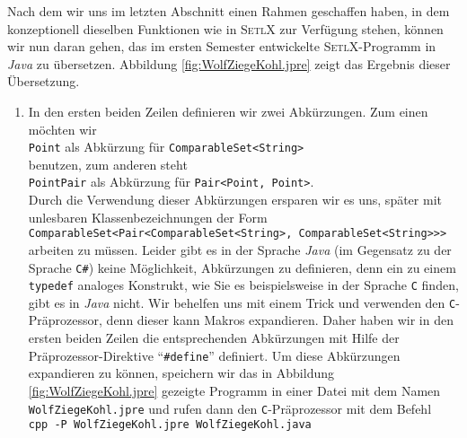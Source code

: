 \noindent
Nach dem wir uns im letzten Abschnitt einen Rahmen geschaffen haben, in dem konzeptionell
dieselben Funktionen wie in \textsc{SetlX} zur Verf\"ugung stehen, k\"onnen wir nun daran
gehen, das im ersten Semester entwickelte \textsc{SetlX}-Programm in \textsl{Java} zu \"ubersetzen.
Abbildung \ref{fig:WolfZiegeKohl.jpre} zeigt das Ergebnis dieser Übersetzung.
\begin{enumerate}
\item In den ersten beiden Zeilen definieren wir zwei Abk\"urzungen.  Zum einen m\"ochten wir
      \\[0.2cm]
      \hspace*{1.3cm}
      \texttt{Point} \quad als Abk\"urzung f\"ur \quad \texttt{ComparableSet<String>}
      \\[0.2cm]
      benutzen, zum anderen steht
      \\[0.2cm]
      \hspace*{1.3cm}
      \texttt{PointPair} \quad als Abk\"urzung f\"ur \quad \texttt{Pair<Point, Point>}.
      \\[0.2cm]
      Durch die Verwendung dieser Abk\"urzungen ersparen wir es uns, sp\"ater mit
      unlesbaren Klassenbezeichnungen der Form
      \\[0.2cm]
      \hspace*{1.3cm}
      \texttt{ComparableSet<Pair<ComparableSet<String>, ComparableSet<String>>>}
      \\[0.2cm]
      arbeiten zu m\"ussen.  Leider gibt es in der Sprache \textsl{Java} (im Gegensatz zu der
      Sprache \texttt{C\#}) keine
      M\"oglichkeit, Abk\"urzungen zu definieren, denn ein zu einem \texttt{typedef} analoges
      Konstrukt, wie Sie es beispielsweise in der Sprache \texttt{C} finden,
      gibt es in \textsl{Java} nicht.  Wir behelfen uns mit einem Trick und verwenden den
      \texttt{C}-Pr\"aprozessor, denn dieser kann Makros expandieren.  Daher haben wir in
      den ersten beiden Zeilen die entsprechenden Abk\"urzungen mit Hilfe der
      Pr\"aprozessor-Direktive ``\texttt{\#define}'' definiert.
      Um diese Abk\"urzungen expandieren zu k\"onnen, speichern wir das in Abbildung
      \ref{fig:WolfZiegeKohl.jpre} gezeigte Programm in einer Datei mit dem Namen
      \texttt{WolfZiegeKohl.jpre} und rufen dann den \texttt{C}-Pr\"aprozessor mit dem Befehl
      \\[0.2cm]
      \hspace*{1.3cm}
      \texttt{cpp -P WolfZiegeKohl.jpre WolfZiegeKohl.java}
      \\[0.2cm]

\end{enumerate}
